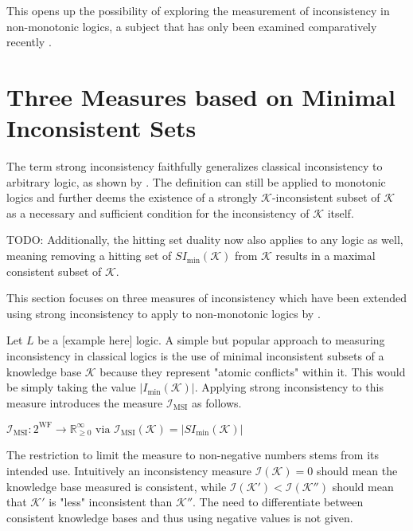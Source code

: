 This opens up the possibility of exploring the measurement of inconsistency in non-monotonic logics, a subject that has only been examined comparatively recently \cite{ulbricht_measuring_2018} \cite{brewka_strong_2019} \cite{ulbricht_handling_2020}.

\section{Three Measures based on Minimal Inconsistent Sets}
The term strong inconsistency faithfully generalizes classical inconsistency to arbitrary logic, as shown by \cite{brewka_strong_2017}. The definition can still be applied to monotonic logics and further deems the existence of a strongly \(\mathcal{K}\)-inconsistent subset of \(\mathcal{K}\) as a necessary and sufficient condition for the inconsistency of \(\mathcal{K}\) itself.

\begin{theorem}
    TODO:
    Additionally, the hitting set duality now also applies to any logic as well, meaning removing a hitting set of \(SI_{\min}(\mathcal{K})\) from \(\mathcal{K}\) results in a maximal consistent subset of \(\mathcal{K}\).
\end{theorem}

This section focuses on three measures of inconsistency which have been extended using strong inconsistency to apply to non-monotonic logics by \cite{ulbricht_handling_2020}.

Let \(L\) be a [example here] logic. A simple but popular approach to measuring inconsistency in classical logics is the use of minimal inconsistent subsets of a knowledge base \(\mathcal{K}\) because they represent "atomic conflicts" within it. This would be simply taking the value \(\left| I_{\min}(\mathcal{K}) \right|\). Applying strong inconsistency to this measure introduces the measure \(\mathcal{I}_{\text{MSI}}\) as follows.

\begin{definition}
    \(\mathcal{I}_{\text{MSI}}: 2^{\text{WF}} \rightarrow \mathbb{R}_{\geq 0}^{\infty} \text{ via } \mathcal{I}_{\text{MSI}}(\mathcal{K}) = \left| SI_{\min}(\mathcal{K}) \right|\)
\end{definition}

The restriction to limit the measure to non-negative numbers stems from its intended use. Intuitively an inconsistency measure \(\mathcal{I}(\mathcal{K}) = 0\) should mean the knowledge base measured is consistent, while \(\mathcal{I}(\mathcal{K}') < \mathcal{I}(\mathcal{K}'')\) should mean that \(\mathcal{K}'\) is "less" inconsistent than \(\mathcal{K}''\). The need to differentiate between consistent knowledge bases and thus using negative values is not given.

